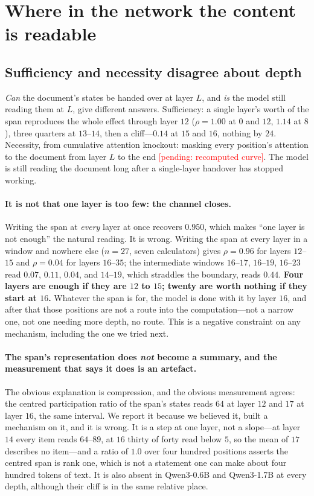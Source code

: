\documentclass{article}
\newcommand{\PEND}[1]{\textcolor{red}{[pending: #1]}}
\begin{document}
\section{Where in the network the content is readable}
\label{sec:where}

\subsection{Sufficiency and necessity disagree about depth}
\label{sec:depth}

\emph{Can} the document's states be handed over at layer $L$, and \emph{is} the
model still reading them at $L$, give different answers. Sufficiency: a single
layer's worth of the span reproduces the whole effect through layer $12$
($\rho = 1.00$ at $0$ and $12$, $1.14$ at $8$), three quarters at $13$--$14$,
then a cliff---$0.14$ at $15$ and $16$, nothing by $24$. Necessity, from
cumulative attention knockout: masking every position's attention to the
document from layer $L$ to the end \PEND{recomputed curve}. The model is still
reading the document long after a single-layer handover has stopped working.

\paragraph{It is not that one layer is too few: the channel closes.} Writing the
span at \emph{every} layer at once recovers $0.950$, which makes ``one layer is
not enough'' the natural reading. It is wrong. Writing the span at every layer
in a window and nowhere else ($n=27$, seven calculators) gives $\rho = 0.96$ for
layers $12$--$15$ and $\rho = 0.04$ for layers $16$--$35$; the intermediate
windows $16$--$17$, $16$--$19$, $16$--$23$ read $0.07$, $0.11$, $0.04$, and
$14$--$19$, which straddles the boundary, reads $0.44$. \textbf{Four layers are
enough if they are $12$ to $15$; twenty are worth nothing if they start at
$16$.} Whatever the span is for, the model is done with it by layer $16$, and
after that those positions are not a route into the computation---not a narrow
one, not one needing more depth, no route. This is a negative constraint on any
mechanism, including the one we tried next.

\paragraph{The span's representation does \emph{not} become a summary, and the
measurement that says it does is an artefact.} The obvious explanation is
compression, and the obvious measurement agrees: the centred participation ratio
of the span's states reads $64$ at layer $12$ and $17$ at layer $16$, the same
interval. We report it because we believed it, built a mechanism on it, and it
is wrong. It is a step at one layer, not a slope---at layer $14$ every item
reads $64$--$89$, at $16$ thirty of forty read below $5$, so the mean of $17$
describes no item---and a ratio of $1.0$ over four hundred positions asserts the
centred span is rank one, which is not a statement one can make about four
hundred tokens of text. It is also absent in Qwen3-0.6B and Qwen3-1.7B at every
depth, although their cliff is in the same relative place.
\end{document}
